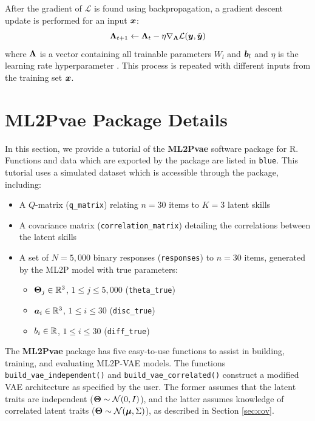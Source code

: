After the gradient of $\mathcal{L}$ is found using backpropagation, a gradient descent update is performed for an input $\boldsymbol{x}$:
\begin{equation}
  \boldsymbol{\Lambda}_{t+1} \gets \boldsymbol{\Lambda}_{t} - \eta \nabla_{\boldsymbol{\Lambda}} \mathcal{L}(\boldsymbol{y}, \hat{\boldsymbol{y}})
  \label{eq:grad_update}
\end{equation}
where $\boldsymbol{\Lambda}$ is a vector containing all trainable parameters $W_l$ and $\boldsymbol{b}_l$ and $\eta$ is the learning rate hyperparameter \cite{ruder2017}. This process is repeated with different inputs from the training set $\boldsymbol{x}$. 


\chapter{\textbf{ML2Pvae} Package Details} \label{apdx:software}
In this section, we provide a tutorial of the \textbf{ML2Pvae} software package for R. Functions and data which are exported by the package are listed in {\color{blue}\verb!blue!}. This tutorial uses a simulated dataset which is accessible through the package, including:
\begin{itemize}
  \item A $Q$-matrix ({\color{blue}\verb!q_matrix!}) relating $n = 30$ items to $K = 3$ latent skills
  \item A covariance matrix ({\color{blue}\verb!correlation_matrix!}) detailing the correlations between the latent skills
  \item A set of $N = 5,000$ binary responses ({\color{blue}\verb!responses!}) to $n = 30$ items, generated by the ML2P model with true parameters:
    \begin{itemize}
      \item $\boldsymbol{\Theta}_j \in \mathbb{R}^3$, $1\leq j \leq 5,000$ ({\color{blue}\verb!theta_true!})
      \item $\boldsymbol{a}_i \in \mathbb{R}^3$, $1\leq i \leq 30$ ({\color{blue}\verb!disc_true!})
      \item $b_i\in \mathbb{R}$, $1\leq i \leq 30$ ({\color{blue}\verb!diff_true!}) 
    \end{itemize}
\end{itemize}

The \textbf{ML2Pvae} package has five easy-to-use functions to assist in building, training, and evaluating ML2P-VAE models. The functions {\color{blue}\verb!build_vae_independent()!} and {\color{blue}\verb!build_vae_correlated()!} construct a modified VAE architecture as specified by the user. The former assumes that the latent traits are independent ($\boldsymbol{\Theta} \sim \mathcal{N}(0,I)$), and the latter assumes knowledge of correlated latent traits ($\boldsymbol{\Theta} \sim \mathcal{N}(\boldsymbol{\mu}, \Sigma)$), as described in Section \ref{sec:cov}.

